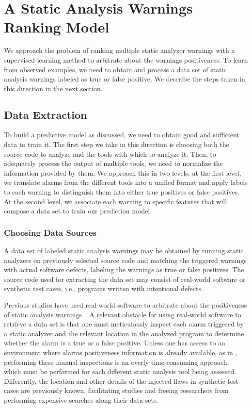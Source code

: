 \chapter{A Static Analysis Warnings Ranking Model}
\label{ch:ranking}

We approach the problem of ranking multiple static analyzer warnings with a
supervised learning method to arbitrate about the warnings positiveness. To
learn from observed examples, we need to obtain and process a data set of static
analysis warnings labeled as true or false positive. We describe the steps taken
in this direction in the next section.

\section{Data Extraction}
\label{sec:data}

To build a predictive model as discussed, we need to obtain good and sufficient
data to train it. The first step we take in this direction is choosing both the
source code to analyze and the tools with which to analyze it. Then, to
adequately process the output of multiple tools, we need to normalize the
information provided by them. We approach this in two levels: at the first
level, we translate alarms from the different tools into a unified format and
apply labels to each warning to distinguish them into either true positives or
false positives. At the second level, we associate each warning to specific
features that will compose a data set to train our prediction model.

\subsection{Choosing Data Sources}

A data set of labeled static analysis warnings may be obtained by running
static analyzers on previously selected source code and matching the
triggered warnings with actual software defects, labeling the warnings as true
or false positives. The source code used for extracting the data set may
consist of real-world software or synthetic test cases, i.e., programs written
with intentional defects.

Previous studies have used real-world software to arbitrate about the
positiveness of static analysis warnings~\citep{kremenek2004correlation,
jung2005taming, yoon2014reducing, yuksel2013classification,
ruthruff_predicting_2008}. A relevant obstacle for using real-world software to
retrieve a data set is that one must meticulously inspect each alarm triggered
by a static analyzer and the relevant location in the analyzed program to
determine whether the alarm is a true or a false positive.  Unless one has
access to an environment where alarms positiveness information is already
available, as in \cite{ruthruff_predicting_2008}, performing these
manual inspections is an overly time-consuming approach, which must be
performed for each different static analysis tool being assessed. Differently,
the location and other details of the injected flaws in synthetic test cases
are previously known, facilitating studies and freeing researchers from
performing expensive searches along their data sets.

